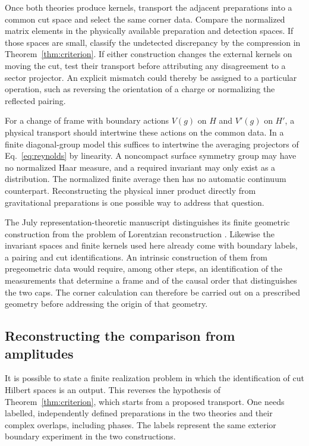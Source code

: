 \documentclass[11pt,letterpaper]{article}
\begin{document}
Once both theories produce kernels, transport the adjacent preparations
into a common cut space and select the same corner data. Compare the
normalized matrix elements in the physically available preparation and
detection spaces. If those spaces are small, classify the undetected
discrepancy by the compression in Theorem~\ref{thm:criterion}.
If either construction changes the external kernels on moving the cut, test
their transport before attributing any disagreement to a sector projector.
An explicit mismatch could thereby be assigned to a particular operation,
such as reversing the orientation of a charge or normalizing the reflected
pairing.

For a change of frame with boundary actions \(V(g)\) on \(H\) and
\(V'(g)\) on \(H'\), a physical transport should intertwine these actions on
the common data. In a finite diagonal-group model this suffices to
intertwine the averaging projectors of Eq.~\eqref{eq:reynolds} by linearity.
A noncompact surface symmetry group may have no normalized Haar measure,
and a required invariant may only exist as a distribution. The normalized
finite average then has no automatic continuum counterpart. Reconstructing
the physical inner product directly from gravitational preparations is one
possible way to address that question.

The July representation-theoretic manuscript distinguishes its finite
geometric construction from the problem of Lorentzian reconstruction
\cite{cond}. Likewise the invariant spaces and finite kernels used here
already come with boundary labels, a pairing and cut identifications. An
intrinsic construction of them from pregeometric data would require,
among other steps, an identification of the measurements that determine
a frame and of the causal order that distinguishes the two caps.
The corner calculation can therefore be carried out on a prescribed
geometry before addressing the origin of that geometry.

\subsection{Reconstructing the comparison from amplitudes}
It is possible to state a finite realization problem in which the
identification of cut Hilbert spaces is an output. This reverses the
hypothesis of Theorem~\ref{thm:criterion}, which starts from a proposed
transport. One needs labelled, independently defined preparations in the
two theories and their complex overlaps, including phases. The labels
represent the same exterior boundary experiment in the two constructions.
\end{document}
